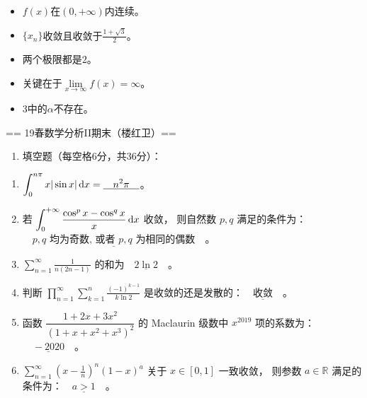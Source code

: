 \begin{proofc}[答案]\begin{itemize}
\item[一] $f(x)$在$(0,+\infty)$内连续。
\item[二] $\{x_n\}$收敛且收敛于$\frac{1+\sqrt{3}}{2}$。
\item[三] 两个极限都是$2$。
\item[四] 关键在于$\lim\limits_{x\to\infty}f(x)=\infty$。
\item[五] 3中的$\alpha$不存在。\qedhere\end{itemize}\end{proofc}

== 19春数学分析II期末（楼红卫）==
\begin{enumerate}
\item 填空题（每空格6分，共36分）：
\end{enumerate}
\begin{enumerate}[label=(\arabic*)]
\item $\displaystyle\int_{0}^{n\pi} x|\sin x|\,{\rm d} x=\underline{\quad n^2\pi \quad}$。
\item 若 $\displaystyle\int_{0}^{+\infty} \frac{\cos^{p}x-\cos^{q}x}{x}\,{\rm d} x$ 收敛，
则自然数 $p, q$ 满足的条件为：$\underline{\quad p,q\text{ 均为奇数, 或者 }p,q\text{ 为相同的偶数} \quad}$。
\item $\displaystyle\sum_{n=1}^{\infty} \frac{1}{n(2n-1)}$ 的和为$\underline{\quad 2\ln 2 \quad}$。
\item 判断 $\displaystyle\prod_{n=1}^{\infty} \sum_{k=1}^{n} \frac{(-1)^{k-1}}{k\ln 2}$ 是收敛的还是发散的：$\underline{\quad\text{收敛}\quad}$。
\item 函数 $\dfrac{1+2x+3x^{2}}{(1+x+x^{2}+x^{3})^{2}}$ 的 Maclaurin 级数中 $x^{2019}$ 项的系数为：$\underline{\quad -2020 \quad}$。
\item $\displaystyle\sum_{n=1}^{\infty}\left(x-\frac{1}{n}\right)^{n}(1-x)^{a}$ 关于 $x \in[0,1]$ 一致收敛，
则参数 $a \in \mathbb{R}$ 满足的条件为：$\underline{\quad a>1 \quad}$。
\end{enumerate}
